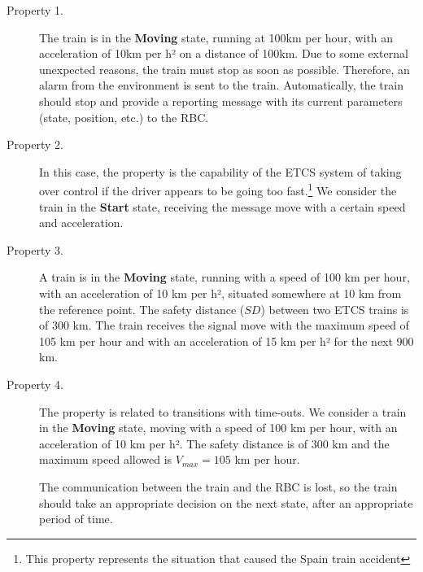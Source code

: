 \documentclass{template/openetcs_article}
\begin{document}
\begin{description}

\item[Property 1.]
The train is in the \textbf{Moving} state, running at 100km per hour, with an acceleration of 10km per h² on a distance of 100km. Due to some external unexpected reasons, the train must stop as soon as possible. Therefore, an alarm from the environment is sent to the train. Automatically, the train should stop and provide a reporting message with its current parameters (state, position, etc.) to the RBC.

\item[Property 2.]
In this case, the property is the capability of the ETCS system of taking over control if the driver appears to be going too fast.\footnote{This property represents the situation that caused the Spain train accident}  We consider the train in the \textbf{Start} state, receiving the message move with a certain speed and acceleration.

\item[Property 3.]
A train is in the \textbf{Moving} state, running with a speed of 100 km per hour, with an acceleration of 10 km per h², situated somewhere at 10 km from the reference point. The safety distance ($SD$) between two ETCS trains is of 300 km. The train receives the signal move with the maximum speed of 105 km per hour and with an acceleration of 15 km per h² for the next 900 km.

\item[Property 4.]
The property is related to transitions with time-outs. We consider a train in the \textbf{Moving} state, moving with a speed of 100 km per hour, with an acceleration of 10 km per h². The safety distance is of 300 km and the maximum speed allowed is $V_{max} = 105$ km per hour. 

The communication between the train and the RBC is lost, so the train should take an appropriate decision on the next state, after an appropriate period of time.
\end{description}
\end{document}
